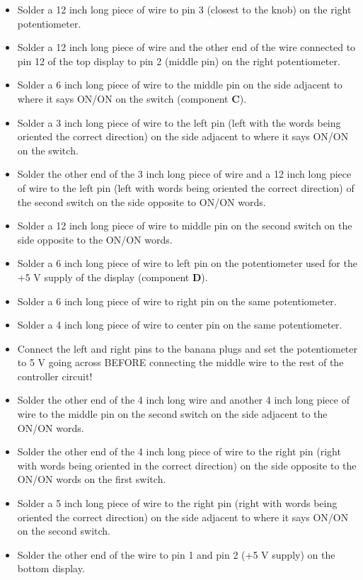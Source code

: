 \documentclass[10pt,letterpaper]{article}
\begin{document}
\begin{itemize}
    \item Solder a 12 inch long piece of wire to pin 3 (closest to the knob) on the right potentiometer.
    \item Solder a 12 inch long piece of wire and the other end of the wire connected to pin 12 of the top display to pin 2 (middle pin) on the right potentiometer.
    \item Solder a 6 inch long piece of wire to the middle pin on the side adjacent to where it says ON/ON on the switch (component \textbf{C}).
    \item Solder a 3 inch long piece of wire to the left pin (left with the words being oriented the correct direction) on the side adjacent to where it says ON/ON on the switch.
    \item Solder the other end of the 3 inch long piece of wire and a 12 inch long piece of wire to the left pin (left with words being oriented the correct direction) of the second switch on the side opposite to ON/ON words.
    \item Solder a 12 inch long piece of wire to middle pin on the second switch on the side opposite to the ON/ON words.
    \item Solder a 6 inch long piece of wire to left pin on the potentiometer used for the  +5 V supply of the display (component \textbf{D}).
    \item Solder a 6 inch long piece of wire to right pin on the same potentiometer.
    \item Solder a 4 inch long piece of wire to center pin on the same potentiometer. 
    \item Connect the left and right pins to the banana plugs and set the potentiometer to 5 V going across BEFORE connecting the middle wire to the rest of the controller circuit! 
    \item Solder the other end of the 4 inch long wire and another 4 inch long piece of wire to the middle pin on the second switch on the side adjacent to the ON/ON words.
    \item Solder the other end of the 4 inch long piece of wire to the right pin (right with words being oriented in the correct direction) on the side opposite to the ON/ON words on the first switch.
    \item Solder a 5 inch long piece of wire to the right pin (right with words being oriented the correct direction) on the side adjacent to where it says ON/ON on the second switch.
    \item Solder the other end of the wire to pin 1 and pin 2 (+5 V supply) on the bottom display.

\end{itemize}
\end{document}
